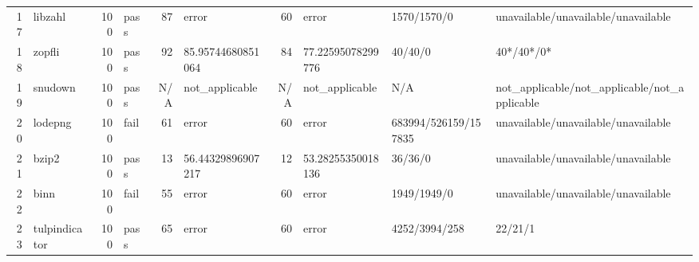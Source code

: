 \documentclass{article}
\begin{document}
\begin{longtable}{r l r l r l r l l l}
17 & libzahl & 100 & pass & 87 & error & 60 & error & 1570/1570/0 & unavailable/unavailable/unavailable\\
18 & zopfli & 100 & pass & 92 & 85.95744680851064 & 84 & 77.22595078299776 & 40/40/0 & 40*/40*/0*\\
19 & snudown & 100 & pass & N/A & not\_applicable & N/A & not\_applicable & N/A & not\_applicable/not\_applicable/not\_applicable\\
20 & lodepng & 100 & fail & 61 & error & 60 & error & 683994/526159/157835 & unavailable/unavailable/unavailable\\
21 & bzip2 & 100 & pass & 13 & 56.44329896907217 & 12 & 53.28255350018136 & 36/36/0 & unavailable/unavailable/unavailable\\
22 & binn & 100 & fail & 55 & error & 60 & error & 1949/1949/0 & unavailable/unavailable/unavailable\\
23 & tulpindicator & 100 & pass & 65 & error & 60 & error & 4252/3994/258 & 22/21/1\\
\end{longtable}
\end{document}
